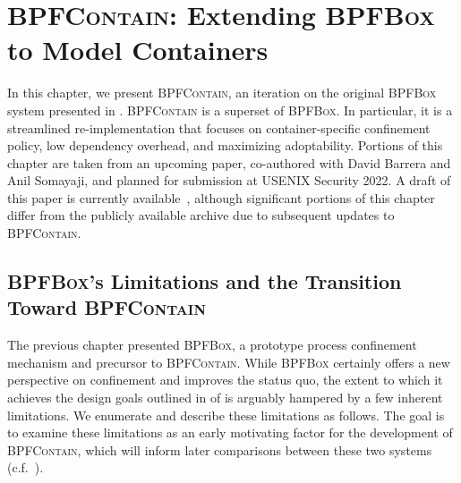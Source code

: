 \documentclass[
  fontsize=12pt,
  titlepage=firstiscover,
  paper=letter,
oneside,
  cleardoublepage=plain,
  parskip=half-,
  DIV=10,
  parindent,
  appendixprefix,
  chapterprefix,
  listof=totoc,
]{scrbook}
\newcommand{\bpfbox}{\textsc{BPFBox}}
\newcommand{\bpfcontain}{\textsc{BPFContain}}
\begin{document}
\chapter{\bpfcontain: Extending \bpfbox{} to Model Containers}\label{c:bpfcontain}
In this chapter, we present \bpfcontain{}, an iteration on the original \bpfbox{} system
presented in . \bpfcontain{} is a superset of \bpfbox. In particular, it is
a streamlined re-implementation that focuses on container-specific confinement policy, low
dependency overhead, and maximizing adoptability. Portions of this chapter are taken from
an upcoming paper, co-authored with David Barrera and Anil Somayaji, and planned for
submission at USENIX Security 2022. A draft of this paper is currently
available~\cite{findlay2021_bpfcontain}, although significant portions of this chapter
differ from the publicly available archive due to subsequent updates to \bpfcontain{}.



\section{\bpfbox{}'s Limitations and the Transition Toward \bpfcontain{}}\label{s:bpfcontain-bpfbox-limitations}

The previous chapter presented \bpfbox{}, a prototype process confinement mechanism and
precursor to \bpfcontain{}. While \bpfbox{} certainly offers a new perspective on
confinement and improves the status quo, the extent to which it achieves the design goals
outlined in  of  is arguably hampered by
a few inherent limitations. We enumerate and describe these limitations as follows.  The
goal is to examine these limitations as an early motivating factor for the development of
\bpfcontain{}, which will inform later comparisons between these two systems
(c.f.\ ).
\end{document}
